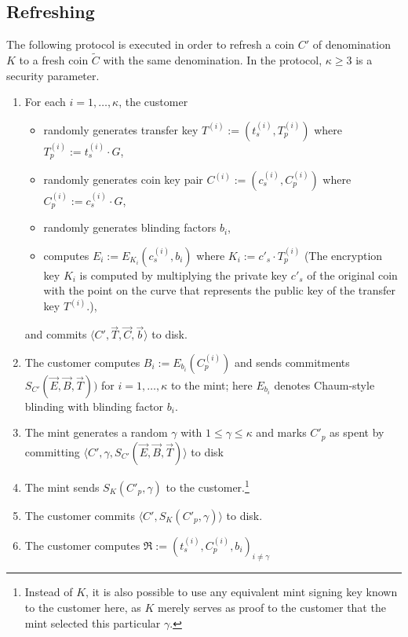 \documentclass{llncs}
\begin{document}
\subsection{Refreshing}

The following protocol is executed in order to refresh a coin $C'$ of denomination $K$ to
a fresh coin $\widetilde{C}$ with the same denomination. In the protocol, $\kappa \ge 3$ is a security parameter.

\begin{enumerate}
  \item For each $i = 1,\ldots,\kappa$, the customer
    \begin{itemize}
      \item randomly generates transfer key $T^{(i)} := \left(t^{(i)}_s,T^{(i)}_p\right)$ where $T^{(i)}_p := t^{(i)}_s \cdot G$,
      \item randomly generates coin key pair $C^{(i)} := \left(c_s^{(i)}, C_p^{(i)}\right)$ where $C^{(i)}_p := c^{(i)}_s \cdot G$,
      \item randomly generates blinding factors $b_i$,
      \item computes $E_i := E_{K_i}\left(c_s^{(i)}, b_i\right)$ where $K_i := c'_s \cdot T_p^{(i)}$ (The encryption key $K_i$ is
            computed by multiplying the private key $c'_s$ of the original coin with the point on the curve
            that represents the public key of the transfer key $T^{(i)}$.),
    \end{itemize}
    and commits $\langle C', \vec{T}, \vec{C}, \vec{b} \rangle$ to disk.
  \item The customer computes $B_i := E_{b_i}(C^{(i)}_p)$ and sends commitments
    $S_{C'}(\vec{E}, \vec{B}, \vec{T}))$ for $i=1,\ldots,\kappa$ to the mint;
    here $E_{b_i}$ denotes Chaum-style blinding with blinding factor $b_i$.
  \item The mint generates a random $\gamma$ with $1 \le \gamma \le \kappa$ and
    marks $C'_p$ as spent by committing
    $\langle C', \gamma, S_{C'}(\vec{E}, \vec{B}, \vec{T}) \rangle$ to disk
  \item The mint sends $S_K(C'_p, \gamma)$ to the customer.\footnote{Instead of $K$, it is also
    possible to use any equivalent mint signing key known to the customer here, as $K$ merely 
    serves as proof to the customer that the mint selected this particular $\gamma$.}
  \item The customer commits $\langle C', S_K(C'_p, \gamma) \rangle$ to disk.
  \item The customer computes $\mathfrak{R} := \left(t_s^{(i)}, C_p^{(i)}, b_i\right)_{i \ne \gamma}$

\end{enumerate}
\end{document}
